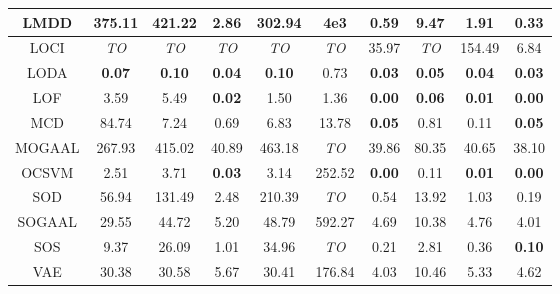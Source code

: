 \documentclass{article}
\begin{document}
\begin{table}[!t]
\begin{center}
\begin{small}
\begin{tabular}{|c|c|c|c|c|c|c|c|c|c|}
\hline
LMDD &        375.11 &             421.22 &          2.86 &              302.94 &       4e3 &               0.59 &            9.47 &          1.91 &          0.33 \\
\hline
LOCI &   \textit{TO} &        \textit{TO} &   \textit{TO} &         \textit{TO} &   \textit{TO} &              35.97 &     \textit{TO} &        154.49 &          6.84 \\
\hline
LODA & \textbf{0.07} &      \textbf{0.10} & \textbf{0.04} &       \textbf{0.10} &          0.73 &      \textbf{0.03} &   \textbf{0.05} & \textbf{0.04} & \textbf{0.03} \\
\hline
LOF &          3.59 &               5.49 & \textbf{0.02} &                1.50 &          1.36 &      \textbf{0.00} &   \textbf{0.06} & \textbf{0.01} & \textbf{0.00} \\
\hline
MCD &         84.74 &               7.24 &          0.69 &                6.83 &         13.78 &      \textbf{0.05} &            0.81 &          0.11 & \textbf{0.05} \\
\hline
MOGAAL &        267.93 &             415.02 &         40.89 &              463.18 &   \textit{TO} &              39.86 &           80.35 &         40.65 &         38.10 \\
\hline
OCSVM &          2.51 &               3.71 & \textbf{0.03} &                3.14 &        252.52 &      \textbf{0.00} &            0.11 & \textbf{0.01} & \textbf{0.00} \\
\hline
SOD &         56.94 &             131.49 &          2.48 &              210.39 &   \textit{TO} &               0.54 &           13.92 &          1.03 &          0.19 \\
\hline
SOGAAL &         29.55 &              44.72 &          5.20 &               48.79 &        592.27 &               4.69 &           10.38 &          4.76 &          4.01 \\
\hline
SOS &          9.37 &              26.09 &          1.01 &               34.96 &   \textit{TO} &               0.21 &            2.81 &          0.36 & \textbf{0.10} \\
\hline
VAE &         30.38 &              30.58 &          5.67 &               30.41 &        176.84 &               4.03 &           10.46 &          5.33 &          4.62 \\
\hline
\end{tabular}
\end{small}
\end{center}
\vskip -0.1in
\end{table}
\end{document}
